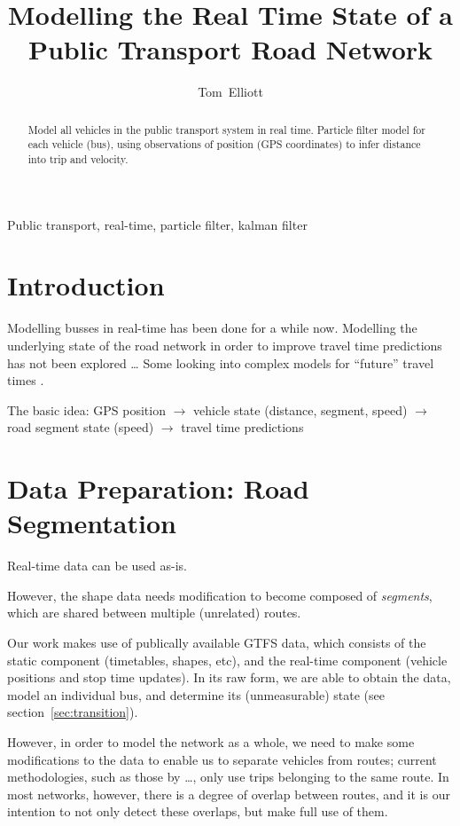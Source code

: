 \documentclass[draft,a4paper,onecolumn]{IEEEtran}\usepackage[]{graphicx}\usepackage[]{color}
\title{Modelling the Real Time State of a Public Transport Road Network}
\author{Tom~Elliott}
\begin{document}
\maketitle


\begin{abstract}
  Model all vehicles in the public transport system in real time.
  Particle filter model for each vehicle (bus),
  using observations of position (GPS coordinates) to infer distance into trip
  and velocity.
\end{abstract}

\begin{IEEEkeywords}
  Public transport, real-time, particle filter, kalman filter
\end{IEEEkeywords}


\section{Introduction}
\label{sec:intro}


Modelling busses in real-time has been done for a while now.
Modelling the underlying state of the road network in order to improve 
travel time predictions has not been explored \ldots
Some looking into complex models for ``future'' travel times \cite{Julio2016}.


The basic idea:
GPS position $\rightarrow$ 
vehicle state (distance, segment, speed) $\rightarrow$
road segment state (speed) $\rightarrow$
travel time predictions



\section{Data Preparation: Road Segmentation}
\label{sec:gtfs}

Real-time data can be used as-is.

However, the shape data needs modification to become composed of \emph{segments},
which are shared between multiple (unrelated) routes.


Our work makes use of publically available GTFS data,
which consists of the static component (timetables, shapes, etc),
and the real-time component (vehicle positions and stop time updates).
In its raw form, we are able to obtain the data,
model an individual bus, and determine its (unmeasurable) state
(see section~\ref{sec:transition}).


However, in order to model the network as a whole, 
we need to make some modifications to the data to enable us to 
separate vehicles from routes;
current methodologies, such as those by \ldots,
only use trips belonging to the same route.
In most networks, however,
there is a degree of overlap between routes,
and it is our intention to not only detect these overlaps,
but make full use of them.
\end{document}
